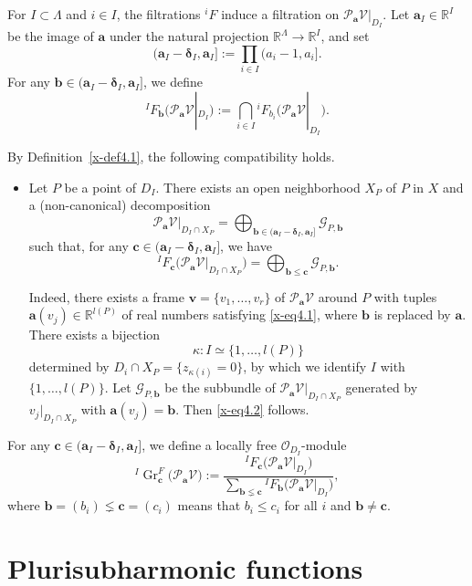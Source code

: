 \documentclass[12pt,twoside]{amsart}
\DeclareMathOperator{\Gr}{Gr}
\theoremstyle{definition}
\begin{document}
For $I \subset \Lambda$ and $i \in I$, the filtrations ${}^i\!F$ induce a
filtration on $\mathcal P_{\bm a} \mathcal V|_{D_I}$.
Let $\bm a_I \in \mathbb R^I$ be the image of $\bm a$ under the natural
projection $\mathbb R^\Lambda \to \mathbb R^I$, and set
\[
(\bm a_I - \bm\delta_I, \bm a_I]
:= \prod_{i \in I} (a_i-1,a_i].
\]
For any $\bm b \in (\bm a_I - \bm\delta_I, \bm a_I]$, we define
\[
{}^I\!F_{\bm b}
\bigl( \mathcal P_{\bm a} \mathcal V|_{D_I} \bigr)
:=
\bigcap_{i \in I}
{}^i\!F_{b_i}
\bigl( \mathcal P_{\bm a} \mathcal V|_{D_I} \bigr).
\]

By Definition~\ref{x-def4.1}, the following compatibility holds.
\begin{itemize}
\item
Let $P$ be a point of $D_I$.
There exists an open neighborhood $X_P$ of $P$ in $X$ and a
(non-canonical) decomposition
\[
\mathcal P_{\bm a} \mathcal V|_{D_I \cap X_P}
=
\bigoplus_{\bm b \in (\bm a_I-\bm\delta_I,\bm a_I]}
\mathcal G_{P,\bm b}
\]
such that, for any
$\bm c \in (\bm a_I-\bm\delta_I,\bm a_I]$, we have
\begin{equation}\label{x-eq4.2}
{}^I\!F_{\bm c}
\bigl( \mathcal P_{\bm a} \mathcal V|_{D_I \cap X_P} \bigr)
=
\bigoplus_{\bm b \le \bm c}
\mathcal G_{P,\bm b}.
\end{equation}

Indeed, there exists a frame
$\bm v=\{v_1,\ldots,v_r\}$ of $\mathcal P_{\bm a} \mathcal V$ around $P$
with tuples $\bm a(v_j) \in \mathbb R^{l(P)}$ of real numbers satisfying
\eqref{x-eq4.1}, where $\bm b$ is replaced by $\bm a$.
There exists a bijection
\[
\kappa \colon I \simeq \{1,\ldots,l(P)\}
\]
determined by
$D_i \cap X_P = \{ z_{\kappa(i)} = 0 \}$,
by which we identify $I$ with $\{1,\ldots,l(P)\}$.
Let $\mathcal G_{P,\bm b}$ be the subbundle of
$\mathcal P_{\bm a} \mathcal V|_{D_I \cap X_P}$ generated by
$v_j|_{D_I \cap X_P}$ with $\bm a(v_j)=\bm b$.
Then \eqref{x-eq4.2} follows.
\end{itemize}

For any $\bm c \in (\bm a_I-\bm\delta_I,\bm a_I]$, we define a locally free
$\mathcal O_{D_I}$-module
\[
{}^I\!\Gr^F_{\bm c}
\bigl( \mathcal P_{\bm a} \mathcal V \bigr)
:=
\frac{
{}^I\!F_{\bm c}
\bigl( \mathcal P_{\bm a} \mathcal V|_{D_I} \bigr)
}{
\sum_{\bm b \lneq \bm c}
{}^I\!F_{\bm b}
\bigl( \mathcal P_{\bm a} \mathcal V|_{D_I} \bigr)
},
\]
where $\bm b=(b_i)\lneq \bm c=(c_i)$ means that $b_i\le c_i$ for all $i$
and $\bm b\neq\bm c$.

\section{Plurisubharmonic functions}\label{x-sec5}
\end{document}
